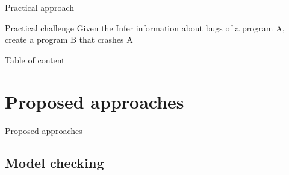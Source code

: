 \documentclass{beamer}
\begin{document}
\begin{frame}{Practical approach}

\begin{block}{Practical challenge}
Given the Infer information about bugs of a program A, create a program B that crashes A
\end{block}

\end{frame}

\begin{frame}{Table of content}
\tableofcontents
\end{frame}

\section{Proposed approaches}

\begin{frame}
\centering

P\LARGE roposed approaches
\end{frame}


\subsection{Model checking}
\end{document}
